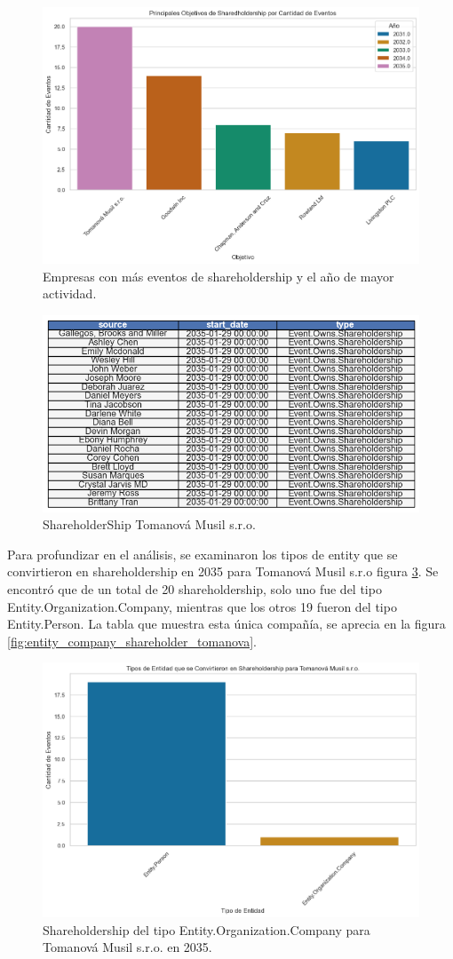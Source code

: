 \documentclass[11pt,spanish,a4paper]{article}
\begin{document}
\begin{figure}[H]
  \centering
  \includegraphics[width=0.7\linewidth]{graphs/principales_objetivos_sharedholdership.png}
  \caption{Empresas con más eventos de shareholdership y el año de mayor actividad.}
  \label{fig:principales_objetivos_shareholdership}
\end{figure}

\begin{figure}[H]
  \centering
  \includegraphics[width=0.7\linewidth]{graphs/tabla_sharedholdership_tomanova_20235.png}
  \caption{ShareholderShip Tomanová Musil s.r.o.}
  \label{fig:shareholdership_tomanova}
\end{figure}

Para profundizar en el análisis, se examinaron los tipos de entity que se convirtieron en shareholdership en 2035 para Tomanová Musil s.r.o figura \ref{fig:distribuicion_shareholdership_tomanova}. Se encontró que de un total de 20 shareholdership, solo uno fue del tipo Entity.Organization.Company, mientras que los otros 19 fueron del tipo Entity.Person. La tabla que muestra esta única compañía, se aprecia en la figura \ref{fig:entity_company_shareholder_tomanova}.

\begin{figure}[H]
  \centering
  \includegraphics[width=0.7\linewidth]{graphs/distribuicion_shareholdership_tomanova.png}
  \caption{Shareholdership del tipo Entity.Organization.Company para Tomanová Musil s.r.o. en 2035.}
  \label{fig:distribuicion_shareholdership_tomanova}
\end{figure}
\end{document}
